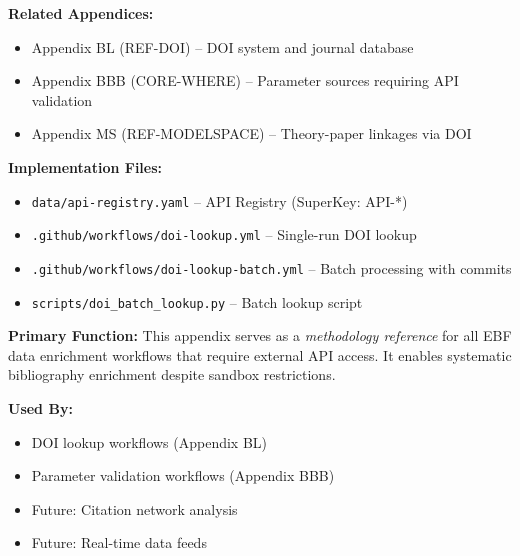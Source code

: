 \begin{tcolorbox}[colback=gray!5, colframe=gray!50, title=Cross-Reference Map]
\small
\textbf{Related Appendices:}
\begin{itemize}[noitemsep]
    \item Appendix BL (REF-DOI) -- DOI system and journal database
    \item Appendix BBB (CORE-WHERE) -- Parameter sources requiring API validation
    \item Appendix MS (REF-MODELSPACE) -- Theory-paper linkages via DOI
\end{itemize}

\textbf{Implementation Files:}
\begin{itemize}[noitemsep]
    \item \texttt{data/api-registry.yaml} -- API Registry (SuperKey: API-*)
    \item \texttt{.github/workflows/doi-lookup.yml} -- Single-run DOI lookup
    \item \texttt{.github/workflows/doi-lookup-batch.yml} -- Batch processing with commits
    \item \texttt{scripts/doi\_batch\_lookup.py} -- Batch lookup script
\end{itemize}
\end{tcolorbox}

\begin{tcolorbox}[colback=blue!5, colframe=blue!50, title=Chapter Linkage]
\small
\textbf{Primary Function:} This appendix serves as a \emph{methodology reference} for all EBF data enrichment workflows that require external API access. It enables systematic bibliography enrichment despite sandbox restrictions.

\textbf{Used By:}
\begin{itemize}[noitemsep]
    \item DOI lookup workflows (Appendix BL)
    \item Parameter validation workflows (Appendix BBB)
    \item Future: Citation network analysis
    \item Future: Real-time data feeds
\end{itemize}
\end{tcolorbox}

